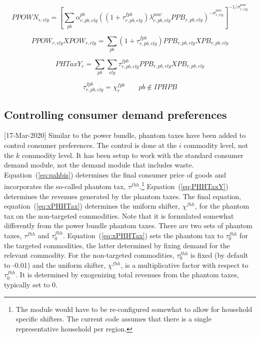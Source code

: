 \documentclass[11pt,letterpaper]{report}
\begin{document}
\begin{equation}
\label{eq:PPOWNDXbis}
\mathit{PPOWN}_{r,\mathit{ely}} =
\left[\sum_{\mathit{pb}} {
\alpha^{\mathit{pb}}_{r,\mathit{pb},\mathit{ely}}\left(
{ \left(1+\tau^{\mathit{fpb}}_{r,\mathit{pb},\mathit{ely}}\right) \lambda^{\mathit{pow}}_{r,\mathit{pb},\mathit{ely}} \mathit{PPB}_{r,\mathit{pb},\mathit{ely}}}
\right)^{-\sigma^{\mathit{pow}}_{r,\mathit{ely}}}}
\right]^{-1/\sigma^{\mathit{pow}}_{r,\mathit{ely}}}
\end{equation}

\begin{equation}
\label{eq:PPOWbis}
\mathit{PPOW}_{r,\mathit{ely}} \mathit{XPOW}_{r,\mathit{ely}}=\sum_{\mathit{pb}}{
\left(1+\tau^{\mathit{fpb}}_{r,\mathit{pb},\mathit{ely}}\right) \mathit{PPB}_{r,\mathit{pb},\mathit{ely}} \mathit{XPB}_{r,\mathit{pb},\mathit{ely}}}
\end{equation}

\begin{equation}
\label{eq:PHTaxY}
\mathit{PHTaxY}_{r} = \sum_{\mathit{pb}}{\sum_{\mathit{ely}}{
\tau^{\mathit{fpb}}_{r,\mathit{pb},\mathit{ely}} \mathit{PPB}_{r,\mathit{pb},\mathit{ely}} \mathit{XPB}_{r,\mathit{pb},\mathit{ely}}}}
\end{equation}

\begin{equation}
\label{eq:xPHTax}
\tau^{\mathit{fpb}}_{r,\mathit{pb},\mathit{ely}} = \chi^{\mathit{fpb}}_{r} \qquad \mathit{pb} \notin {\mathit{IPHPB}}
\end{equation}

\subsection{Controlling consumer demand preferences}

[17-Mar-2020] Similar to the power bundle, phantom taxes have
been added to control consumer preferences. The control is
done at the $i$ commodity level, not the $k$ commodity level.
It has been setup to work with the standard consumer demand
module, not the demand module that includes waste.
Equation~(\ref{eq:pahbis}) determines the final consumer
price of goods and incorporates the so-called phantom
tax, $\tau^{\mathit{fhh}}$.\footnote{The module would have to
be re-configured somewhat to allow for household specific shifters.
The current code assumes that there is a single representative
household per region.} Equation~(\ref{eq:PHHTaxY}) determines the
revenues generated by the phantom taxes.
The final equation, equation~(\ref{eq:xPHHTax}) determines the
uniform shifter, $\chi^{\mathit{fhh}}$, for the phantom
tax on the non-targeted commodities. Note that it is formulated
somewhat differently from the power bundle phantom taxes.
There are two sets of phantom taxes, $\tau^{fhh}$ and $\tau^{\mathit{fhh}}_0$.
Equation~(\ref{eq:xPHHTax}) sets the phantom tax to $\tau^{fhh}_0$
for the targeted commodities, the latter determined by fixing
demand for the relevant commodity. For the non-targeted commodities,
$\tau^{fhh}_0$ is fixed (by default to -0.01) and the uniform
shifter, $\chi^{\mathit{fhh}}$, is a multiplicative factor with respect to
$\tau^{\mathit{fhh}}_0$. It is determined by exogenizing total revenues from
the phantom taxes, typically set to 0.
\end{document}
